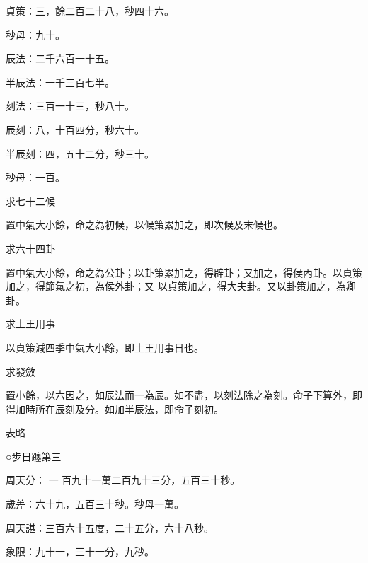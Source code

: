 \begin{pinyinscope}
 貞策：三，餘二百二十八，秒四十六。



 秒母：九十。



 辰法：二千六百一十五。



 半辰法：一千三百七半。



 刻法：三百一十三，秒八十。



 辰刻：八，十百四分，秒六十。



 半辰刻：四，五十二分，秒三十。



 秒母：一百。



 求七十二候



 置中氣大小餘，命之為初候，以候策累加之，即次候及末候也。



 求六十四卦



 置中氣大小餘，命之為公卦；以卦策累加之，得辟卦；又加之，得侯內卦。以貞策加之，得節氣之初，為侯外卦；又
 以貞策加之，得大夫卦。又以卦策加之，為卿卦。



 求土王用事



 以貞策減四季中氣大小餘，即土王用事日也。



 求發斂



 置小餘，以六因之，如辰法而一為辰。如不盡，以刻法除之為刻。命子下算外，即得加時所在辰刻及分。如加半辰法，即命子刻初。



 表略



 ○步日躔第三



 周天分：
 一
 百九十一萬二百九十三分，五百三十秒。



 歲差：六十九，五百三十秒。秒母一萬。



 周天諶：三百六十五度，二十五分，六十八秒。



 象限：九十一，三十一分，九秒。




\end{pinyinscope}
